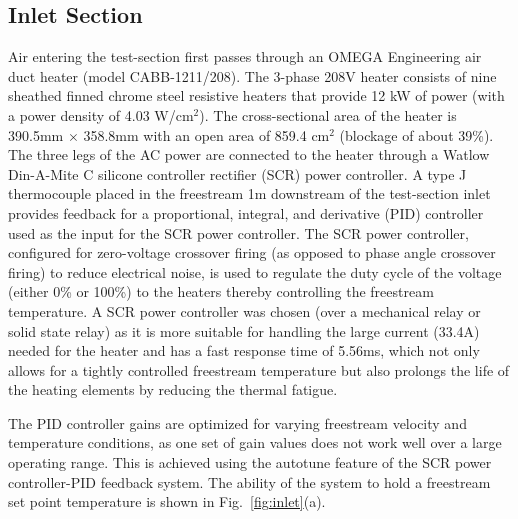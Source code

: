 \subsection{Inlet Section}
Air entering the test-section first passes through an OMEGA Engineering air duct heater (model CABB-1211/208). 
The 3-phase 208V heater consists of nine sheathed finned chrome steel resistive heaters that provide 12 kW of power (with a power density of 4.03 W/cm$^2$). 
The cross-sectional area of the heater is 390.5mm $\times$ 358.8mm with an open area of 859.4 cm$^2$ (blockage of about 39\%). 
The three legs of the AC power are connected to the heater through a Watlow Din-A-Mite C silicone controller rectifier (SCR) power controller. 
A type J thermocouple placed in the freestream 1m downstream of the test-section inlet provides feedback for a proportional, integral, and derivative (PID) controller used as the input for the SCR power controller. 
The SCR power controller, configured for zero-voltage crossover firing (as opposed to phase angle crossover firing) to reduce electrical noise, is used to regulate the duty cycle of the voltage (either 0\% or 100\%) to the heaters thereby controlling the freestream temperature. 
A SCR power controller was chosen (over a mechanical relay or solid state relay) as it is more suitable for handling the large current (33.4A) needed for the heater and has a fast response time of 5.56ms, which not only allows for a tightly controlled freestream temperature but also prolongs the life of the heating elements by reducing the thermal fatigue.

The PID controller gains are optimized for varying freestream velocity and temperature conditions, as one set of gain values does not work well over a large operating range. 
This is achieved using the autotune feature of the SCR power controller-PID feedback system. 
The ability of the system to hold a freestream set point temperature is shown in Fig.~\ref{fig:inlet}(a). 

